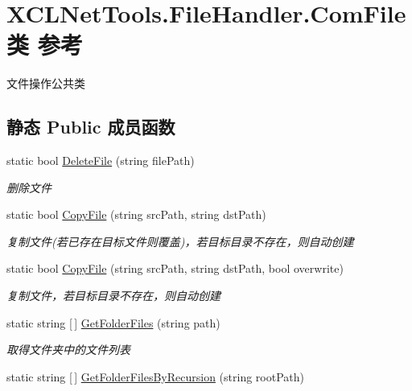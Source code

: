 \hypertarget{class_x_c_l_net_tools_1_1_file_handler_1_1_com_file}{}\section{X\+C\+L\+Net\+Tools.\+File\+Handler.\+Com\+File类 参考}
\label{class_x_c_l_net_tools_1_1_file_handler_1_1_com_file}


文件操作公共类  


\subsection*{静态 Public 成员函数}
\begin{DoxyCompactItemize}
\item 
static bool \hyperlink{class_x_c_l_net_tools_1_1_file_handler_1_1_com_file_a7cc80f663aa1e69cf43af4a902243cc3}{Delete\+File} (string file\+Path)
\begin{DoxyCompactList}\small\item\em 删除文件 \end{DoxyCompactList}\item 
static bool \hyperlink{class_x_c_l_net_tools_1_1_file_handler_1_1_com_file_ae8479a1330655aa229ed6222410b7823}{Copy\+File} (string src\+Path, string dst\+Path)
\begin{DoxyCompactList}\small\item\em 复制文件(若已存在目标文件则覆盖)，若目标目录不存在，则自动创建 \end{DoxyCompactList}\item 
static bool \hyperlink{class_x_c_l_net_tools_1_1_file_handler_1_1_com_file_a1e917318b8b594c94d0fb50223f34648}{Copy\+File} (string src\+Path, string dst\+Path, bool overwrite)
\begin{DoxyCompactList}\small\item\em 复制文件，若目标目录不存在，则自动创建 \end{DoxyCompactList}\item 
static string \mbox{[}$\,$\mbox{]} \hyperlink{class_x_c_l_net_tools_1_1_file_handler_1_1_com_file_ae82ff285ff8d522f3d6096c26e70ce40}{Get\+Folder\+Files} (string path)
\begin{DoxyCompactList}\small\item\em 取得文件夹中的文件列表 \end{DoxyCompactList}\item 
static string \mbox{[}$\,$\mbox{]} \hyperlink{class_x_c_l_net_tools_1_1_file_handler_1_1_com_file_a674fdbb6dfba9453918df90642428caf}{Get\+Folder\+Files\+By\+Recursion} (string root\+Path)

\end{DoxyCompactItemize}
